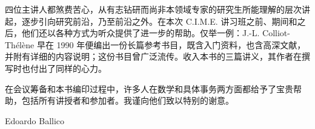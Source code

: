 四位主讲人都煞费苦心，从有志钻研而尚非本领域专家的研究生所能理解的层次讲起，逐步引向研究前沿，乃至前沿之外。在本次 C.I.M.E. 讲习班之前、期间和之后，他们还以各种方式为听众提供了进一步的帮助。仅举一例：J.-L. Colliot-Thélène 早在 1990 年便编出一份长篇参考书目，既含入门资料，也含高深文献，并附有详细的内容说明；这份书目曾广泛流传。收入本书的三篇讲义，其作者在撰写时也付出了同样的心力。

在会议筹备和本书编印过程中，许多人在数学和具体事务两方面都给予了宝贵帮助，包括所有讲授者和参加者。我谨向他们致以特别的谢意。

\begin{flushright}Edoardo Ballico\end{flushright}
